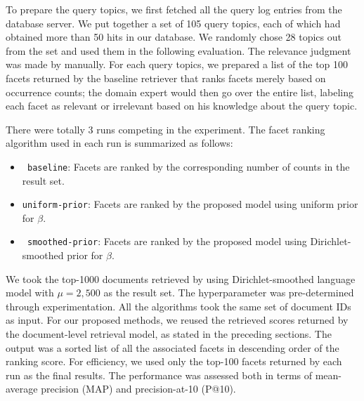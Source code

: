 
To prepare the query topics, we first fetched all the query log entries from
the database server.  We put together a set of 105 query topics, each of which
had obtained more than 50 hits in our database.  We randomly chose 28 topics
out from the set and used them in the following evaluation.  The relevance
judgment was made by manually.  For each query topics, we prepared a list of
the top 100 facets returned by the baseline retriever that ranks facets merely
based on occurrence counts; the domain expert would then go over the entire
list, labeling each facet as relevant or irrelevant based on his knowledge
about the query topic.

There were totally 3 runs competing in the experiment.  The facet ranking
algorithm used in each run is summarized as follows: \begin{itemize} \item {\tt
baseline}:  Facets are ranked by the corresponding number of counts in the
result set.  \item {\tt uniform-prior}:  Facets are ranked by the proposed 
model using uniform prior for $\beta$.  \item {\tt
smoothed-prior}:  Facets are ranked by the proposed model using
Dirichlet-smoothed prior for $\beta$.  \end{itemize}

We took the top-1000 documents retrieved by using Dirichlet-smoothed language
model with $\mu = 2,500$ as the result set.  The hyperparameter was
pre-determined through experimentation.  All the algorithms took the same set
of document IDs as input.  For our proposed methods, we reused the retrieved
scores returned by the document-level retrieval model, as stated in the
preceding sections.  The output was a sorted list of all the associated facets
in descending order of the ranking score.  For efficiency, we used only the
top-100 facets returned by each run as the final results.  The performance was
assessed both in terms of mean-average precision (MAP) and precision-at-10
(P@10).  

